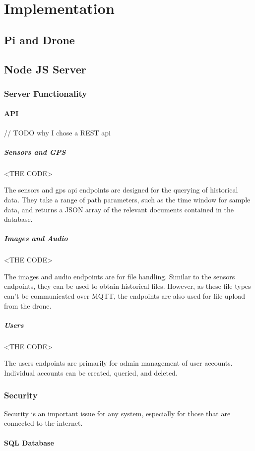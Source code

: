 \documentclass{article}
\begin{document}
\section{Implementation}
\subsection{Pi and Drone}
\subsection{Node JS Server}


\subsubsection{Server Functionality}

\paragraph{API}
// TODO why I chose a REST api
\subparagraph{Sensors and GPS}
\begin{center}
	<THE CODE>
\end{center}
The sensors and gps api endpoints are designed for the querying of historical data. They take a range of path parameters, such as the time window for sample data, and returns a JSON array of the relevant documents contained in the database.

\subparagraph{Images and Audio}
\begin{center}
	<THE CODE>
\end{center}
The images and audio endpoints are for file handling. Similar to the sensors endpoints, they can be used to obtain historical files. However, as these file types can't be communicated over MQTT, the endpoints are also used for file upload from the drone. 

\subparagraph{Users}
\begin{center}
	<THE CODE>
\end{center}
The users endpoints are primarily for admin management of user accounts. Individual accounts can be created, queried, and deleted. 


\subsubsection{Security}
Security is an important issue for any system, especially for those that are connected to the internet. 
\paragraph{SQL Database}
\end{document}
